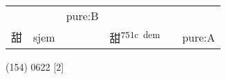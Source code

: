 \documentclass[14pt,a4paper]{scrartcl}
\begin{document}
\begin{longtable}[c]{@{}llllll@{}}
\begin{minipage}[t]{0.14\columnwidth}\raggedright\strut
\strut\end{minipage} &
\begin{minipage}[t]{0.14\columnwidth}\raggedright\strut
\strut\end{minipage} &
\begin{minipage}[t]{0.14\columnwidth}\raggedright\strut
pure:B
\strut\end{minipage}\tabularnewline
\begin{minipage}[t]{0.14\columnwidth}\raggedright\strut
甜
\strut\end{minipage} &
\begin{minipage}[t]{0.14\columnwidth}\raggedright\strut
sjem
\strut\end{minipage} &
\begin{minipage}[t]{0.14\columnwidth}\raggedright\strut
\strut\end{minipage} &
\begin{minipage}[t]{0.14\columnwidth}\raggedright\strut
甜\textsuperscript{751c~dem}
\strut\end{minipage} &
\begin{minipage}[t]{0.14\columnwidth}\raggedright\strut
\strut\end{minipage} &
\begin{minipage}[t]{0.14\columnwidth}\raggedright\strut
pure:A
\strut\end{minipage}\tabularnewline
\bottomrule
\end{longtable}

(154) 0622 {[}2{]}
\end{document}
